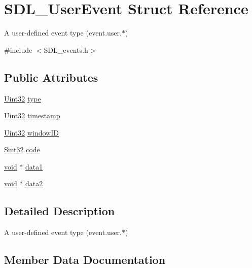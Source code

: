 \hypertarget{struct_s_d_l___user_event}{}\section{S\+D\+L\+\_\+\+User\+Event Struct Reference}
\label{struct_s_d_l___user_event}


A user-\/defined event type (event.\+user.$\ast$)  




{\ttfamily \#include $<$S\+D\+L\+\_\+events.\+h$>$}

\subsection*{Public Attributes}
\begin{DoxyCompactItemize}
\item 
\hyperlink{_s_d_l__stdinc_8h_add440eff171ea5f55cb00c4a9ab8672d}{Uint32} \hyperlink{struct_s_d_l___user_event_ab7afa8b98dbd7b52bef41155e10f7340}{type}
\item 
\hyperlink{_s_d_l__stdinc_8h_add440eff171ea5f55cb00c4a9ab8672d}{Uint32} \hyperlink{struct_s_d_l___user_event_adbf1d34c73138a0c549310e5d4ad0c35}{timestamp}
\item 
\hyperlink{_s_d_l__stdinc_8h_add440eff171ea5f55cb00c4a9ab8672d}{Uint32} \hyperlink{struct_s_d_l___user_event_abccefa10e0e0e3a0801bc6d836a08da7}{window\+ID}
\item 
\hyperlink{_s_d_l__stdinc_8h_a7a90b941db9d4582e9ad7abb9940ff7e}{Sint32} \hyperlink{struct_s_d_l___user_event_aef47976781ee82b527a353c5acfa0a34}{code}
\item 
\hyperlink{_s_d_l__opengles2__gl2ext_8h_ae5d8fa23ad07c48bb609509eae494c95}{void} $\ast$ \hyperlink{struct_s_d_l___user_event_ab2893a12be2f97195f16463a23107913}{data1}
\item 
\hyperlink{_s_d_l__opengles2__gl2ext_8h_ae5d8fa23ad07c48bb609509eae494c95}{void} $\ast$ \hyperlink{struct_s_d_l___user_event_aae4dbf65c34d654c9edf519eb061b7cf}{data2}
\end{DoxyCompactItemize}


\subsection{Detailed Description}
A user-\/defined event type (event.\+user.$\ast$) 

\subsection{Member Data Documentation}
\mbox{\label{struct_s_d_l___user_event_aef47976781ee82b527a353c5acfa0a34}} 
